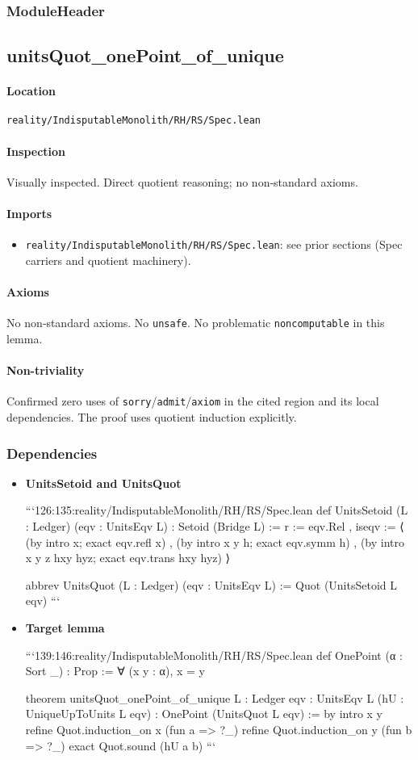 \documentclass{article}
\newcommand{\FileRef}[1]{\texttt{#1}}
\newcommand{\ModuleHeader}[3]{%
  \subsection{#1}
  \paragraph{Location} \FileRef{#2}\\
  \paragraph{Inspection} #3
}
\begin{document}
\subsubsection{ModuleHeader}
\ModuleHeader{unitsQuot\_onePoint\_of\_unique}{reality/IndisputableMonolith/RH/RS/Spec.lean}{Visually inspected. Direct quotient reasoning; no non‑standard axioms.}

\paragraph{Imports}
\begin{itemize}[leftmargin=*]
  \item \FileRef{reality/IndisputableMonolith/RH/RS/Spec.lean}: see prior sections (Spec carriers and quotient machinery).
\end{itemize}

\paragraph{Axioms}
No non‑standard axioms. No \texttt{unsafe}. No problematic \texttt{noncomputable} in this lemma.

\paragraph{Non-triviality}
Confirmed zero uses of \texttt{sorry}/\texttt{admit}/\texttt{axiom} in the cited region and its local dependencies. The proof uses quotient induction explicitly.

\subsubsection{Dependencies}
\begin{itemize}[leftmargin=*]
  \item \textbf{UnitsSetoid and UnitsQuot}

```126:135:reality/IndisputableMonolith/RH/RS/Spec.lean
def UnitsSetoid (L : Ledger) (eqv : UnitsEqv L) : Setoid (Bridge L) :=
{ r := eqv.Rel
, iseqv :=
  ⟨ (by intro x; exact eqv.refl x)
  , (by intro x y h; exact eqv.symm h)
  , (by intro x y z hxy hyz; exact eqv.trans hxy hyz) ⟩ }

abbrev UnitsQuot (L : Ledger) (eqv : UnitsEqv L) := Quot (UnitsSetoid L eqv)
```

  \item \textbf{Target lemma}

```139:146:reality/IndisputableMonolith/RH/RS/Spec.lean
def OnePoint (α : Sort _) : Prop := ∀ (x y : α), x = y

theorem unitsQuot_onePoint_of_unique {L : Ledger} {eqv : UnitsEqv L}
  (hU : UniqueUpToUnits L eqv) : OnePoint (UnitsQuot L eqv) := by
  intro x y
  refine Quot.induction_on x (fun a => ?_)
  refine Quot.induction_on y (fun b => ?_)
  exact Quot.sound (hU a b)
```
\end{itemize}
\end{document}
